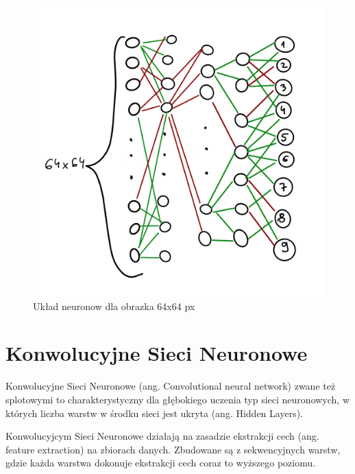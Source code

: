 \documentclass[brudnopis]{xmgr}
\begin{document}
\begin{figure}[!tbh]
\centering
\includegraphics[width=.8\hsize]{fig/2}
\caption{Układ neuronow dla obrazka 64x64 px\label{RYS.2}}
\end{figure}


\section{Konwolucyjne Sieci Neuronowe  \label{s:dsssl}}


Konwolucyjne Sieci Neuronowe (ang. Convolutional neural network) zwane też splotowymi to charakterystyczny dla głębokiego uczenia typ sieci neuronowych, w których liczba warstw w środku sieci jest ukryta (ang. Hidden Layers).

Konwolucyjcym Sieci Neuronowe działają na zasadzie ekstrakcji cech (ang. feature extraction) na zbiorach danych. Zbudowane są z sekwencyjnych warstw, gdzie każda warstwa dokonuje ekstrakcji cech coraz to wyższego poziomu.
\end{document}
